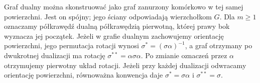 \begin{twierdzenie}
\label{thm:tg-cellular-dual}
Graf dualny można skonstruować jako graf zanurzony
komórkowo w tej samej powierzchni. Jest on spójny;
jego ściany odpowiadają wierzchołkom $G$.
Dla $m\ge1$ oznaczamy półkrawędź dualną półkrawędzią
pierwotną, której prawy bok wyznacza jej początek.
Jeżeli w grafie dualnym zachowujemy orientację powierzchni,
jego permutacja rotacji wynosi
$\sigma^*=(\sigma\alpha)^{-1}$, a graf otrzymany po dwukrotnej dualizacji
ma rotację $\sigma^{**}=\alpha\sigma\alpha$.
Po zmianie oznaczeń przez $\alpha$ otrzymujemy
pierwotny układ rotacji. Jeżeli przy każdej
dualizacji odwracamy orientację powierzchni,
równoważna konwencja daje $\sigma^*=\sigma\alpha$
i $\sigma^{**}=\sigma$.
\end{twierdzenie}

